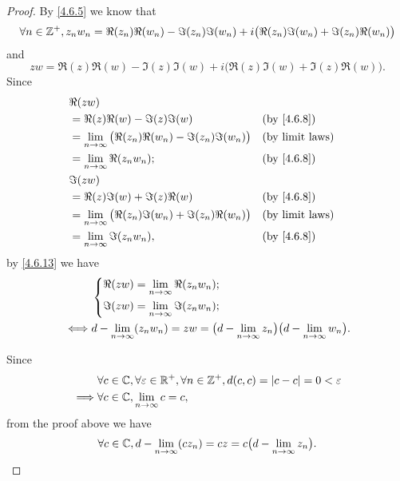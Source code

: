\begin{proof}
  By \cref{4.6.5} we know that
  \[
    \forall n \in \mathbb{Z}^+, z_n w_n = \Re(z_n) \Re(w_n) - \Im(z_n) \Im(w_n) + i \big(\Re(z_n) \Im(w_n) + \Im(z_n) \Re(w_n)\big)
  \]
  and
  \[
    z w = \Re(z) \Re(w) - \Im(z) \Im(w) + i \big(\Re(z) \Im(w) + \Im(z) \Re(w)\big).
  \]
  Since
  \begin{align*}
     & \Re(zw)                                                                                             \\
     & = \Re(z) \Re(w) - \Im(z) \Im(w)                                       &  & \text{(by \cref{4.6.8})} \\
     & = \lim_{n \to \infty} \big(\Re(z_n) \Re(w_n) - \Im(z_n) \Im(w_n)\big) &  & \text{(by limit laws)}   \\
     & = \lim_{n \to \infty} \Re(z_n w_n);                                   &  & \text{(by \cref{4.6.8})} \\
     & \Im(zw)                                                                                             \\
     & = \Re(z) \Im(w) + \Im(z) \Re(w)                                       &  & \text{(by \cref{4.6.8})} \\
     & = \lim_{n \to \infty} \big(\Re(z_n) \Im(w_n) + \Im(z_n) \Re(w_n)\big) &  & \text{(by limit laws)}   \\
     & = \lim_{n \to \infty} \Im(z_n w_n),                                   &  & \text{(by \cref{4.6.8})}
  \end{align*}
  by \cref{4.6.13} we have
  \begin{align*}
         & \begin{dcases}
             \Re(zw) = \lim_{n \to \infty} \Re(z_n w_n); \\
             \Im(zw) = \lim_{n \to \infty} \Im(z_n w_n);
           \end{dcases}                                                                           \\
    \iff & d - \lim_{n \to \infty} (z_n w_n) = zw = \big(d - \lim_{n \to \infty} z_n\big) \big(d - \lim_{n \to \infty} w_n\big).
  \end{align*}

  Since
  \begin{align*}
             & \forall c \in \mathbb{C}, \forall \varepsilon \in \mathbb{R}^+, \forall n \in \mathbb{Z}^+, d(c, c) = \left\lvert c - c\right\rvert = 0 < \varepsilon \\
    \implies & \forall c \in \mathbb{C}, \lim_{n \to \infty} c = c,
  \end{align*}
  from the proof above we have
  \[
    \forall c \in \mathbb{C}, d - \lim_{n \to \infty} (c z_n) = cz = c \big(d - \lim_{n \to \infty} z_n\big).
  \]


\end{proof}
